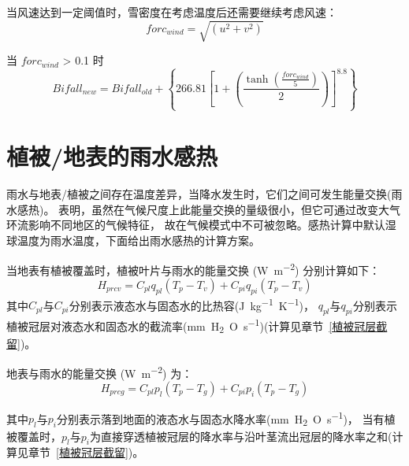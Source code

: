 当风速达到一定阈值时，雪密度在考虑温度后还需要继续考虑风速：
\begin{equation}
forc_{wind} = \sqrt{(u^2 + v^2)}
\end{equation}

当 $forc_{wind}$ > 0.1 时
\begin{equation}
Bifall_{new} = Bifall_{old} + \left\{266.81\left[1 + {\left(\frac{\tanh (\frac{forc_{wind}}{5})}{2}\right)}\right]^{8.8}\right\}
\end{equation}


\section{植被/地表的雨水感热}\label{植被地表的雨水感热}
雨水与地表/植被之间存在温度差异，当降水发生时，它们之间可发生能量交换(雨水感热)。
\citet{wei2014impact} 表明，虽然在气候尺度上此能量交换的量级很小，但它可通过改变大气环流影响不同地区的气候特征，
故在气候模式中不可被忽略。感热计算中默认湿球温度为雨水温度，下面给出雨水感热的计算方案。

当地表有植被覆盖时，植被叶片与雨水的能量交换 (\unit{W.m^{-2}}) 分别计算如下：
\begin{equation}
H_{prcv}=C_{pl} q_{pl}\left(T_{p}-T_{v}\right)+C_{pi} q_{pi}\left(T_{p}-T_{v}\right)
\end{equation}
%
其中$C_{pl}$与$C_{pi}$分别表示液态水与固态水的比热容(\unit{J.kg^{-1}.K^{-1}})，
$q_{pl}$与$q_{pi}$分别表示植被冠层对液态水和固态水的截流率(\unit{mm.H_2O.s^{-1}})(计算见章节~\ref{植被冠层截留})。


地表与雨水的能量交换 (\unit{W.m^{-2}}) 为：
\begin{equation}
H_{p r c g}=C_{p l} p_{l}\left(T_{p}-T_{g}\right)+C_{p i} p_{i}\left(T_{p}-T_{g}\right)
\end{equation}

其中$p_l$与$p_i$分别表示落到地面的液态水与固态水降水率(\unit{mm.H_2O.s^{-1}})，
当有植被覆盖时，$p_l$与$p_i$为直接穿透植被冠层的降水率与沿叶茎流出冠层的降水率之和(计算见章节~\ref{植被冠层截留})。










